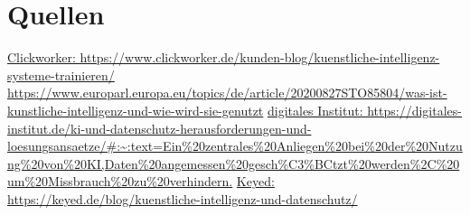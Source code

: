 \documentclass{report}
\begin{document}
\section{Quellen}
\url {Clickworker: https://www.clickworker.de/kunden-blog/kuenstliche-intelligenz-systeme-trainieren/}
\url {https://www.europarl.europa.eu/topics/de/article/20200827STO85804/was-ist-kunstliche-intelligenz-und-wie-wird-sie-genutzt}
\url{digitales Institut: https://digitales-institut.de/ki-und-datenschutz-herausforderungen-und-loesungsansaetze/#:~:text=Ein%20zentrales%20Anliegen%20bei%20der%20Nutzung%20von%20KI,Daten%20angemessen%20gesch%C3%BCtzt%20werden%2C%20um%20Missbrauch%20zu%20verhindern.}
\url { Keyed: https://keyed.de/blog/kuenstliche-intelligenz-und-datenschutz/}
\end{document}
